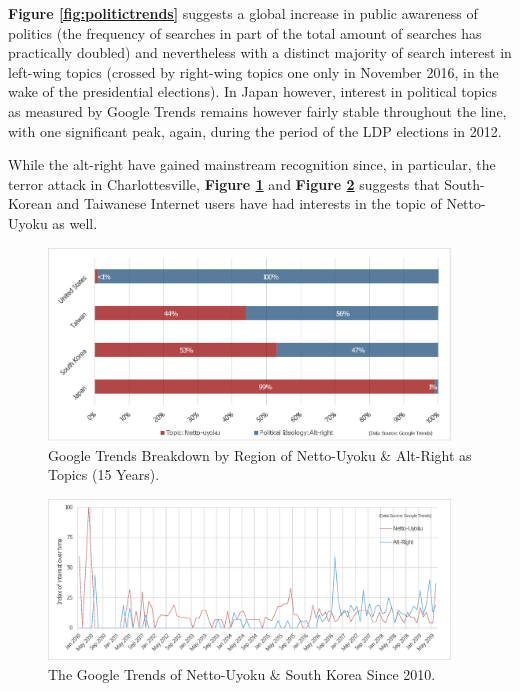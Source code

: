 \documentclass[10pt,british,A4paper,oneside]{memoir}
\begin{document}
\textbf{Figure \ref{fig:politictrends}} suggests a global increase in
public awareness of politics (the frequency of searches in part of the
total amount of searches has practically doubled) and nevertheless with
a distinct majority of search interest in left-wing topics (crossed by
right-wing topics one only in November 2016, in the wake of the
presidential elections). In Japan however, interest in political topics
as measured by Google Trends remains however fairly stable throughout
the line, with one significant peak, again, during the period of the LDP
elections in 2012.

While the alt-right have gained mainstream recognition since, in
particular, the terror attack in Charlottesville, \textbf{Figure
\ref{fig:netto-altright}} and \textbf{Figure
\ref{fig:netto-altright-kor}} suggests that South-Korean and Taiwanese
Internet users have had interests in the topic of Netto-Uyoku as well.

\begin{figure}[!htb]
 \caption{\label{fig:netto-altright} Google Trends Breakdown by Region of Netto-Uyoku \& Alt-Right as Topics (15 Years).}
 \centering
 \includegraphics[width=0.95\textwidth,trim=4 4 4 4,clip]{images/netto-altright.eps}
\end{figure}

\begin{figure}[!htb]
 \caption{\label{fig:netto-altright-kor} The Google Trends of Netto-Uyoku \& South Korea Since 2010.}
 \centering
 \includegraphics[width=0.95\textwidth,trim=4 4 4 4,clip]{images/netto-altright-kor.eps}
\end{figure}
\end{document}
